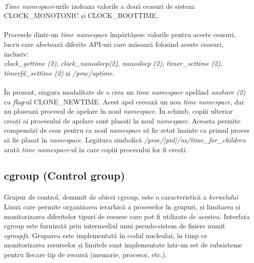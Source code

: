             \paragraph{} \textit{Time namespace}-urile izoleaza valorile a două ceasuri de sistem: CLOCK\_MONO\-TONIC și CLOCK\_BOOTTIME.\cite{ns:time}
            \paragraph{} Procesele dintr-un \textit{time namespace} împărtășesc valorile pentru aceste ceasuri, lucru care afectează diferite API-uri care măsoară folosind aceste ceasuri, inclusiv: \\ \textit{clock\_gettime (2)}, \textit{clock\_nanosleep(2)}, \textit{nanosleep (2)}, \textit{timer\_settime (2)}, \\ \textit{timerfd\_settime (2)} și \textit{/proc/uptime}. \cite{ns:time}
            \paragraph{} În prezent, singura modalitate de a crea un \textit{time namespace} apelând \textit{unshare (2)} cu \textit{flag}-ul CLONE\_NEWTIME. Acest apel creează un nou \textit{time namespace}, dar nu plasează procesul de apelare în noul \textit{namespace}. În schimb, copiii ulterior creați ai procesului de apelare sunt plasați în noul \textit{namespace}. Aceasta permite compensări de ceas pentru ca noul \textit{namespace} să fie setat înainte ca primul proces să fie plasat în \textit{namespace}. Legătura simbolică \textit{/proc/[pid]/ns/time\_for\_children} arată \textit{time namespace}-ul în care copiii procesului for fi creați. \cite{ns:time}

    \subsection{cgroup (Control group)}
        \paragraph{} Grupur de control, denumit de obicei cgroup, este o caracteristică a \textit{kernelului} Linux care permite organizarea ierarhică a proceselor în grupuri, și limitarea și monitorizarea diferitelor tipuri de resurse care pot fi utilizate de acestea. Interfața cgroup este furnizată prin intermediul unui pseudo-sistem de fișiere numit \textit{cgroupfs}. Gruparea este implementată în codul nucleului, în timp ce monitorizarea resurselor și limitele sunt implementate într-un set de subsisteme pentru fiecare tip de resursă (memorie, procesor, etc.). \cite{cg:man}
